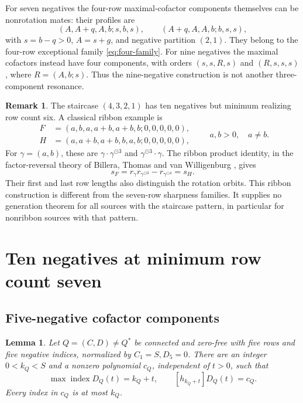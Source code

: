 \documentclass[11pt,a4paper]{amsart}
\numberwithin{equation}{section}
\theoremstyle{plain}
\newtheorem{lemma}[theorem]{Lemma}
\theoremstyle{definition}
\newtheorem{remark}[theorem]{Remark}
\begin{document}
For seven negatives the four-row maximal-cofactor components themselves can be nonrotation mates: their profiles are
\[
 (A,A+q,A,b;s,b,s),\qquad(A+q,A,A,b;b,s,s),
\]
with \(s=b-q>0\), \(A=s+g\), and negative partition \((2,1)\).  They belong to the four-row exceptional family \eqref{eq:four-family}.  For nine negatives the maximal cofactors instead have four components, with orders \((s,s,R,s)\) and \((R,s,s,s)\), where \(R=(A,b;s)\).  Thus the nine-negative construction is not another three-component resonance.

\begin{remark}\label{rem:ribbon-staircase}
The staircase \((4,3,2,1)\) has ten negatives but minimum realizing row count six.  A classical ribbon example is
\[
 \begin{aligned}
 F&=(a,b,a,a+b,a+b,b;0,0,0,0,0),\\
 H&=(a,a+b,a+b,b,a,b;0,0,0,0,0),
 \end{aligned}
 \qquad a,b>0,\quad a\ne b.
\]
For \(\gamma=(a,b)\), these are \(\gamma\cdot\gamma^{\odot3}\) and \(\gamma^{\odot3}\cdot\gamma\).  The ribbon product identity, in the factor-reversal theory of Billera, Thomas and van Willigenburg \cite{Billera2006DecomposableCompositions}, gives
\[
 s_F=r_\gamma r_{\gamma^{\odot3}}-r_{\gamma^{\odot4}}=s_H.
\]
Their first and last row lengths also distinguish the rotation orbits.  This ribbon construction is different from the seven-row sharpness families.  It supplies no generation theorem for all sources with the staircase pattern, in particular for nonribbon sources with that pattern.
\end{remark}

\section{Ten negatives at minimum row count seven}\label{sec:ten-negative}

\subsection{Five-negative cofactor components}

\begin{lemma}\label{lem:five-negative-leading}
Let \(Q=(C,D)\ne Q^*\) be connected and zero-free with five rows and
five negative indices, normalized by \(C_1=S,D_5=0\).  There are an
integer \(0<k_Q<S\) and a nonzero polynomial \(c_Q\), independent of
\(t>0\), such that
\begin{equation}\label{eq:five-negative-leading}
 \max\operatorname{index}D_Q(t)=k_Q+t,\qquad
 [h_{k_Q+t}]D_Q(t)=c_Q.
\end{equation}
Every index in \(c_Q\) is at most \(k_Q\).
\end{lemma}
\end{document}
